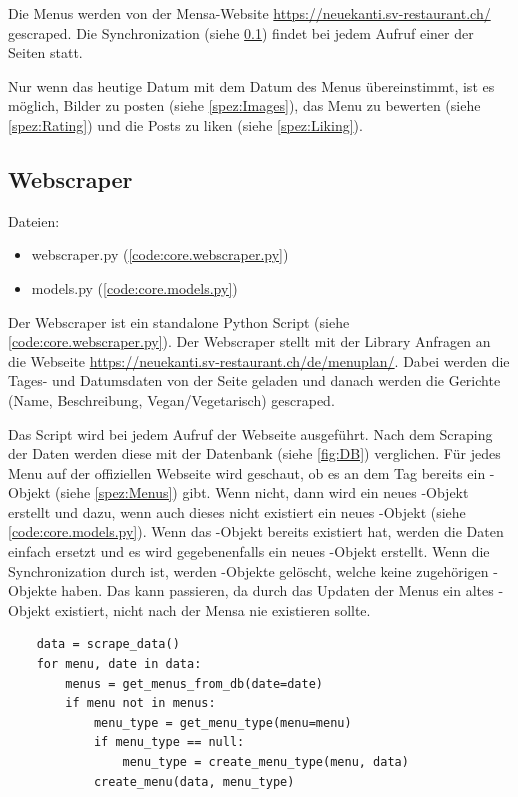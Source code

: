 Die Menus werden von der Mensa-Website \url{https://neuekanti.sv-restaurant.ch/}
gescraped. Die Synchronization (siehe \ref{spez:Webscraper}) findet bei jedem
Aufruf einer der Seiten statt.

Nur wenn das heutige Datum mit dem Datum des Menus übereinstimmt, ist es
möglich, Bilder zu posten (siehe \ref{spez:Images}), das Menu zu bewerten (siehe
\ref{spez:Rating}) und die Posts zu liken (siehe \ref{spez:Liking}).

\subsection{Webscraper} \label{spez:Webscraper}

Dateien:
\begin{itemize}
    \item webscraper.py (\ref{code:core.webscraper.py})
    \item models.py (\ref{code:core.models.py})
\end{itemize}

Der Webscraper ist ein standalone Python Script (siehe
\ref{code:core.webscraper.py}). Der Webscraper stellt mit der Library
 Anfragen an die Webseite
\url{https://neuekanti.sv-restaurant.ch/de/menuplan/}. Dabei werden die Tages-
und Datumsdaten von der Seite geladen und danach werden die Gerichte (Name,
Beschreibung, Vegan/Vegetarisch) gescraped.

Das Script wird bei jedem Aufruf der Webseite ausgeführt. Nach dem Scraping der
Daten werden diese mit der Datenbank (siehe \ref{fig:DB}) verglichen. Für jedes
Menu auf der offiziellen Webseite wird geschaut, ob es an dem Tag bereits ein
-Objekt (siehe \ref{spez:Menus}) gibt. Wenn nicht, dann wird ein
neues -Objekt erstellt und dazu, wenn auch dieses nicht existiert ein
neues -Objekt (siehe \ref{code:core.models.py}). Wenn das
-Objekt bereits existiert hat, werden die Daten einfach ersetzt und
es wird gegebenenfalls ein neues -Objekt erstellt. Wenn die
Synchronization durch ist, werden -Objekte gelöscht, welche keine
zugehörigen -Objekte haben. Das kann passieren, da durch das Updaten
der Menus ein altes -Objekt existiert, nicht nach der Mensa nie
existieren sollte.

\newpage

\begin{lstlisting}
    data = scrape_data()
    for menu, date in data:
        menus = get_menus_from_db(date=date)
        if menu not in menus:
            menu_type = get_menu_type(menu=menu)
            if menu_type == null:
                menu_type = create_menu_type(menu, data)
            create_menu(data, menu_type)
\end{lstlisting}

